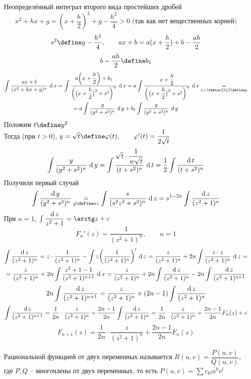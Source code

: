 \begin{undefthm}{Неопределённый интеграл второго вида простейших дробей}
    $$ x^2 + hx + g = (x + \dfrac{h}2)^2 + g - \dfrac{h^2}4 > 0 \text{ (так как нет вещественных корней)} $$
    $$ s^2 \define g - \frac{h^2}4, \qquad ax + b = a(x + \frac{h}2) + b - \frac{ah}2 $$
    $$ b - \frac{ah}2 \define b_1 $$
     \begin{multline*}
         \uint{ \frac{ax + b}{(x^2 + hx + g)^n} } = \uint{ \frac{a \bigg( x + \dfrac{h}2 \bigg) + b_1}{ \bigg( \big( x + \dfrac{h}2 \big)^2 + s^2 \bigg)^n} } = a \uint{ \frac{x + \dfrac{h}2}{ \bigg( \big( x + \dfrac{h}2 \big)^2 + s^2 \bigg)^n} } \underset{x + \faktor{h}2 \define y}= \\ = a \uint[y]{ \frac{y}{(y^2 + s^2)^n} } + b_1 \uint[y]{ \frac{y}{(y^2 + s^2)^n} }
     \end{multline*}
    Положим $ t \define y^2 $ \\
    Тогда (при $t > 0$), $ y = \sqrt{t} \define \vphi(t), \qquad \vphi'(t) = \dfrac1{2\sqrt{t}} $
    $$ \uint[y]{ \frac{y}{(y^2 + s^2)^n} } = \uint[t]{ \frac{\sqrt{t} \cdot \dfrac1{w\sqrt{t}}}{(t + s^2)^n} } = \frac12 \ufint[t]{(t + s^2)^n} $$
    Получили первый случай
    $$ \ufint[y]{(y^2 + s^2)^n} \underset{y \define sz}= \uint[z]{ \frac{s}{(s^2z^2 + s^2)^n}} = s^{1 - 2n} \ufint[z]{(z^2 + 1)^n} $$
    При $n = 1$, $ \ufint[z]{z^2 + 1} = \arctg z + c $
    $$ F_n'(z) = \frac1{(z^2 + 1)^n}, \qquad n = 1 $$
    \begin{multline*}
        \ufint[z]{(z^2 + 1)^n} = z \cdot \frac1{(z^2 + 1)^n} - \uint[z]{z \bigg( \frac1{(z^2 + 1)^n} \bigg)'} = \frac{z}{(z^2 + 1)^n} + 2n \uint[z]{ \frac{z \cdot z}{(z^2 + 1)^n}} = \\ = \frac{z}{(z^2 + 1)^n} + 2n \uint{ \frac{z^2 + 1 - 1}{(z^2 + 1)^{n + 1}}} = \frac{z}{(z^2 + 1)^n} + 2n \ufint[z]{(z^2 + 1)^n} - 2n \ufint[z]{(z^2 + 1)^{n + 1}}
    \end{multline*}
    $$ 2n \ufint[z]{(z^2 + 1)^{n + 1}} = \frac{z}{(z^2 + 1)^n} + (2n - 1) \ufint[z]{(z^2 + 1)^n} $$
    $$ \ufint[z]{(z^2 + 1)^{n + 1}} = \frac1{2n} \cdot \frac{z}{(z^2 + 1)^n} + \frac{2n - 1}{2n} \ufint[z]{(z^2 + 1)^n} = \frac1{2n} \cdot \frac{z}{(z^2 + 1)^n} + \frac{2n - 1}{2n} F_n(z) + c $$
    $$ F_{n + 1}(z) = \frac1{2n} \cdot \frac{z}{(z^2 + 1)^n} + \frac{2n - 1}{2n} F_n(z) $$
\end{undefthm}

\begin{definition}
    Рациональной функцией от двух переменных называется $ R(u, v) = \dfrac{P(u, v)}{Q(u, v)}$, где $P, Q$ -- многочлены от двух переменных, то есть $ P(u, v) = \sum c_{kl}u^kv^l $
\end{definition}


